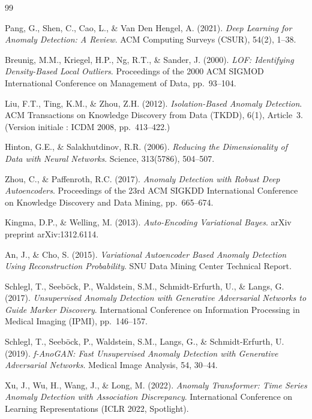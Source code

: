 \documentclass[12pt, a4paper]{article}
\begin{document}
\begin{thebibliography}{99}

Pang, G., Shen, C., Cao, L., \& Van Den Hengel, A. (2021).
\textit{Deep Learning for Anomaly Detection: A Review}.
ACM Computing Surveys (CSUR), 54(2), 1--38.

Breunig, M.M., Kriegel, H.P., Ng, R.T., \& Sander, J. (2000).
\textit{LOF: Identifying Density-Based Local Outliers}.
Proceedings of the 2000 ACM SIGMOD International Conference on
Management of Data, pp.~93--104.

Liu, F.T., Ting, K.M., \& Zhou, Z.H. (2012).
\textit{Isolation-Based Anomaly Detection}.
ACM Transactions on Knowledge Discovery from Data (TKDD), 6(1), Article~3.
(Version initiale : ICDM 2008, pp.~413--422.)

Hinton, G.E., \& Salakhutdinov, R.R. (2006).
\textit{Reducing the Dimensionality of Data with Neural Networks}.
Science, 313(5786), 504--507.

Zhou, C., \& Paffenroth, R.C. (2017).
\textit{Anomaly Detection with Robust Deep Autoencoders}.
Proceedings of the 23rd ACM SIGKDD International Conference on
Knowledge Discovery and Data Mining, pp.~665--674.

Kingma, D.P., \& Welling, M. (2013).
\textit{Auto-Encoding Variational Bayes}.
arXiv preprint arXiv:1312.6114.

An, J., \& Cho, S. (2015).
\textit{Variational Autoencoder Based Anomaly Detection Using
Reconstruction Probability}.
SNU Data Mining Center Technical Report.

Schlegl, T., Seeböck, P., Waldstein, S.M., Schmidt-Erfurth, U., \& Langs, G. (2017).
\textit{Unsupervised Anomaly Detection with Generative Adversarial Networks
to Guide Marker Discovery}.
International Conference on Information Processing in Medical Imaging (IPMI),
pp.~146--157.

Schlegl, T., Seeböck, P., Waldstein, S.M., Langs, G., \& Schmidt-Erfurth, U. (2019).
\textit{f-AnoGAN: Fast Unsupervised Anomaly Detection with Generative
Adversarial Networks}.
Medical Image Analysis, 54, 30--44.

Xu, J., Wu, H., Wang, J., \& Long, M. (2022).
\textit{Anomaly Transformer: Time Series Anomaly Detection with Association
Discrepancy}.
International Conference on Learning Representations (ICLR 2022, Spotlight).


\end{thebibliography}
\end{document}
